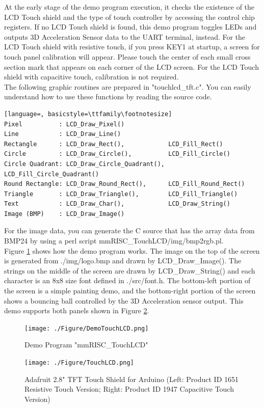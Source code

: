 At the early stage of the demo program execution, it checks the existence of the LCD Touch shield and the type of touch controller by accessing the control chip registers. If no LCD Touch shield is found, this demo program toggles LEDs and outputs 3D Acceleration Sensor data to the UART terminal, instead. For the LCD Touch shield with resistive touch, if you press KEY1 at startup, a screen for touch panel calibration will appear. Please touch the center of each small cross section mark that appears on each corner of the LCD screen. For the LCD Touch shield with capacitive touch, calibration is not required.\\
The following graphic routines are prepared in "touchlcd\_tft.c". You can easily understand how to use these functions by reading the source code.
\begin{lstlisting}[language=, basicstyle=\ttfamily\footnotesize]
Pixel          : LCD_Draw_Pixel()
Line           : LCD_Draw_Line()
Rectangle      : LCD_Draw_Rect(),            LCD_Fill_Rect()
Circle         : LCD_Draw_Circle(),          LCD_Fill_Circle()
Circle Quadrant: LCD_Draw_Circle_Quadrant(), LCD_Fill_Circle_Quadrant()
Round Rectangle: LCD_Draw_Round_Rect(),      LCD_Fill_Round_Rect()
Triangle       : LCD_Draw_Triangle(),        LCD_Fill_Triangle()
Text           : LCD_Draw_Char(),            LCD_Draw_String()
Image (BMP)    : LCD_Draw_Image()
\end{lstlisting}

For the image data, you can generate the C source that has the array data from BMP24 by using a perl script mmRISC\_TouchLCD/img/bmp2rgb.pl.\\
Figure \ref{fig:DEMOTOUCHLCD} shows how the demo program works. The image on the top of the screen is generated from ./img/logo.bmp and drawn by LCD\_Draw\_Image(). The strings on the middle of the screen are drawn by LCD\_Draw\_String() and each character is an 8x8 size font defined in ./src/font.h. The bottom-left portion of the screen is a simple painting demo, and the bottom-right portion of the screen shows a bouncing ball controlled by the 3D Acceleration sensor output. This demo supports both panels shown in Figure \ref{fig:TOUCHLCD}.

\begin{figure}[H]
    \texttt{[image: ./Figure/DemoTouchLCD.png]}
    \caption{Demo Program "mmRISC\_TouchLCD"}
    \label{fig:DEMOTOUCHLCD}
\end{figure}

\begin{figure}[H]
    \texttt{[image: ./Figure/TouchLCD.png]}
    \caption{Adafruit 2.8" TFT Touch Shield for Arduino (Left: Product ID 1651 Resistive Touch Version; Right: Product ID 1947 Capacitive Touch Version)}
    \label{fig:TOUCHLCD}
\end{figure}

